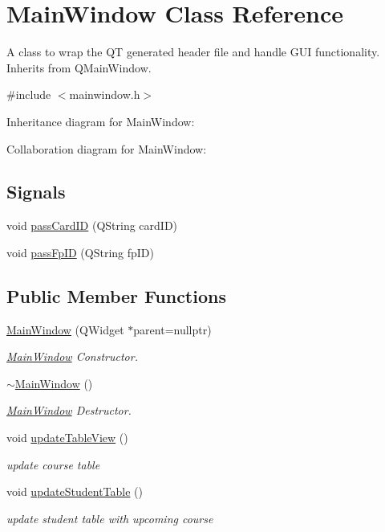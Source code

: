 \hypertarget{class_main_window}{}\section{Main\+Window Class Reference}
\label{class_main_window}


A class to wrap the Q\+T generated header file and handle G\+U\+I functionality. Inherits from Q\+Main\+Window.  




{\ttfamily \#include $<$mainwindow.\+h$>$}



Inheritance diagram for Main\+Window\+:


Collaboration diagram for Main\+Window\+:
\subsection*{Signals}
\begin{DoxyCompactItemize}
\item 
void \hyperlink{class_main_window_a82a7b54e994898bed076451f4b572d89}{pass\+Card\+I\+D} (Q\+String card\+I\+D)
\item 
void \hyperlink{class_main_window_accff5edcedb8592226612c32a3a861d4}{pass\+Fp\+I\+D} (Q\+String fp\+I\+D)
\end{DoxyCompactItemize}
\subsection*{Public Member Functions}
\begin{DoxyCompactItemize}
\item 
\hyperlink{class_main_window_a996c5a2b6f77944776856f08ec30858d}{Main\+Window} (Q\+Widget $\ast$parent=nullptr)
\begin{DoxyCompactList}\small\item\em \hyperlink{class_main_window}{Main\+Window} Constructor. \end{DoxyCompactList}\item 
\hyperlink{class_main_window_ae98d00a93bc118200eeef9f9bba1dba7}{$\sim$\+Main\+Window} ()
\begin{DoxyCompactList}\small\item\em \hyperlink{class_main_window}{Main\+Window} Destructor. \end{DoxyCompactList}\item 
void \hyperlink{class_main_window_a31ebff8b2a54cfd5f634c82253f3ffdd}{update\+Table\+View} ()
\begin{DoxyCompactList}\small\item\em update course table \end{DoxyCompactList}\item 
void \hyperlink{class_main_window_ae72f434e60eb56c5ba1f18c1a0edd2ba}{update\+Student\+Table} ()
\begin{DoxyCompactList}\small\item\em update student table with upcoming course \end{DoxyCompactList}\end{DoxyCompactItemize}
